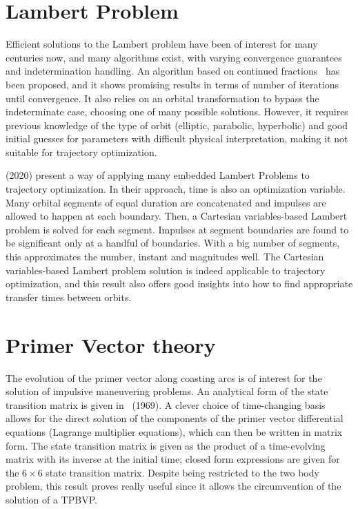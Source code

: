 
\section{Lambert Problem}

Efficient solutions to the Lambert problem have been of interest for many centuries now, and many algorithms exist, with varying convergence guarantees and indetermination handling. An algorithm based on continued fractions~\cite{battin_vaughan_elegant_lambert} has been proposed, and it shows promising results in terms of number of iterations until convergence. It also relies on an orbital transformation to bypass the indeterminate case, choosing one of many possible solutions. However, it requires previous knowledge of the type of orbit (elliptic, parabolic, hyperbolic) and good initial guesses for parameters with difficult physical interpretation, making it not suitable for trajectory optimization.

\citeauthor{embedded_lambert} (2020) present a way of applying many embedded Lambert Problems to trajectory optimization. In their approach, time is also an optimization variable. Many orbital segments of equal duration are concatenated and impulses are allowed to happen at each boundary. Then, a Cartesian variables-based Lambert problem is solved for each segment. Impulses at segment boundaries are found to be significant only at a handful of boundaries. With a big number of segments, this approximates the number, instant and magnitudes well. The Cartesian variables-based Lambert problem solution is indeed applicable to trajectory optimization, and this result also offers good insights into how to find appropriate transfer times between orbits.

\section{Primer Vector theory}

The evolution of the primer vector along coasting arcs is of interest for the solution of impulsive maneuvering problems. An analytical form of the state transition matrix is given in~\citeauthor{glandorf_transition_matrix} (1969). A clever choice of time-changing basis allows for the direct solution of the components of the primer vector differential equations (Lagrange multiplier equations), which can then be written in matrix form. The state transition matrix is given as the product of a time-evolving matrix with its inverse at the initial time; closed form expressions are given for the \(6\times6\) state transition matrix. Despite being restricted to the two body problem, this result proves really useful since it allows the circumvention of the solution of a TPBVP.

